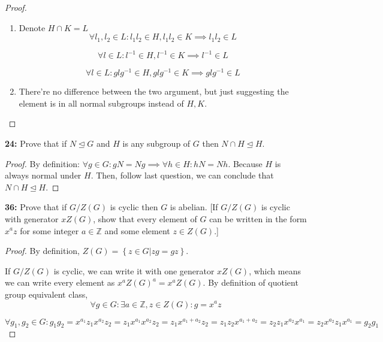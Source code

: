 \documentclass[11pt]{article}
\newcommand{\Z}{\mathbb{Z}}
\newenvironment{exercise}[1]
	{\noindent \textbf{#1:}}
	{\par \vspace{0.5\baselineskip}}
\begin{document}
\begin{proof}
	\begin{enumerate}[label=\emph{\alph*}]
		\item Denote $H \cap K = L$
		      \[
			      \forall l_1, l_2 \in L: l_1l_2 \in H, l_1l_2 \in K \implies l_1l_2 \in L
		      \]

		      \[
			      \forall l \in L: l^{-1} \in H, l^{-1} \in K \implies l^{-1} \in L
		      \]

		      \[
			      \forall l \in L: glg^{-1} \in H, glg^{-1} \in K \implies glg^{-1} \in L
		      \]
		\item There're no difference between the two argument, but just suggesting the element is in all normal subgroups instead of $H,K$.
	\end{enumerate}
\end{proof}

\begin{exercise}{24}
	\textsf{Prove that if \(N \trianglelefteq G\) and \(H\) is any subgroup of \(G\) then \(N \cap H \trianglelefteq H\).}
\end{exercise}{}

\begin{proof}
	By definition: $\forall g \in G: gN=Ng \implies \forall h \in H: hN=Nh$.
	Because $H$ is always normal under $H$.
	Then, follow last question, we can conclude that $N \cap H \trianglelefteq H$.
\end{proof}

\begin{exercise}{36}
	Prove that if \(G/Z(G)\) is cyclic then \(G\) is abelian. [If \(G/Z(G)\) is cyclic with generator \(xZ(G)\), show that every element of \(G\) can be written in the form \(x^{a}z\) for some integer \(a \in \mathbb{Z}\) and some element \(z \in Z(G)\).]
\end{exercise}{}

\begin{proof}
	By definition, $Z(G) = \left\{ z \in G | zg = gz \right\}$.

	If ${G} / Z(G)$ is cyclic, we can write it with one generator $xZ(G)$, which means
	we can write every element as $x^aZ(G)^a=x^aZ(G)$.
	By definition of quotient group equivalent class,
	\[
		\forall g \in G: \exists a \in \Z, z \in Z(G) : g = x^az
	\]

	\[
		\forall g_1,g_2 \in G: g_1g_2 = x^{a_1}z_1x^{a_2}z_2 = z_1x^{a_1}x^{a_2}z_2=z_1x^{a_1+a_2}z_2=z_1z_2x^{a_1+a_2}=z_2z_1x^{a_2}x^{a_1}=z_2x^{a_2}z_1x^{a_1}=g_2g_1
	\]
\end{proof}
\end{document}
